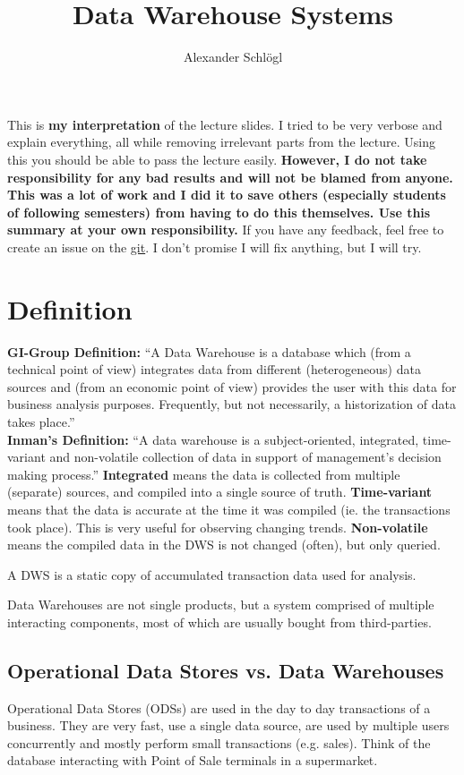 \documentclass{article}
\title{Data Warehouse Systems}
\author{Alexander Schlögl}
\begin{document}
\maketitle

\tableofcontents

This is \textbf{my interpretation} of the lecture slides.
I tried to be very verbose and explain everything, all while removing irrelevant parts from the lecture.
Using this you should be able to pass the lecture easily.
\large{\textbf{However, I do not take responsibility for any bad results and will not be blamed from anyone.
This was a lot of work and I did it to save others (especially students of following semesters) from having to do this themselves.
Use this summary at your own responsibility.}}
If you have any feedback, feel free to create an issue on the \href{https://github.com/alxshine/lecture-notes}{git}.
I don't promise I will fix anything, but I will try.
\newpage

\section{Definition}
\textbf{GI-Group Definition:}
“A Data Warehouse is a database which (from a technical point of view) integrates data from different (heterogeneous) data sources and (from an economic point of view) provides the user with this data for business analysis purposes. Frequently, but not necessarily, a historization of data takes place.”
\\
\textbf{Inman's Definition:}
“A data warehouse is a subject-oriented, integrated, time-variant and non-volatile collection of data in support of management's decision making process.”
\textbf{Integrated} means the data is collected from multiple (separate) sources, and compiled into a single source of truth.
\textbf{Time-variant} means that the data is accurate at the time it was compiled (ie. the transactions took place).
This is very useful for observing changing trends.
\textbf{Non-volatile} means the compiled data in the DWS is not changed (often), but only queried.
\begin{keypointbox}
    A DWS is a static copy of accumulated transaction data used for analysis.
\end{keypointbox}

Data Warehouses are not single products, but a system comprised of multiple interacting components, most of which are usually bought from third-parties.

\subsection{Operational Data Stores vs. Data Warehouses}
Operational Data Stores (ODSs) are used in the day to day transactions of a business.
They are very fast, use a single data source, are used by multiple users concurrently and mostly perform small transactions (e.g. sales).
Think of the database interacting with Point of Sale terminals in a supermarket.
\end{document}
